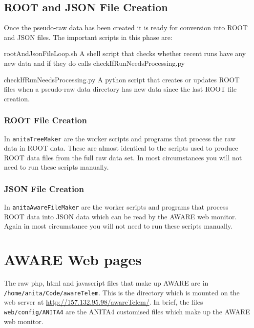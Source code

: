 \documentclass{article}
\begin{document}
\subsection{ROOT and JSON File Creation}
Once the pseudo-raw data has been created it is ready for conversion into ROOT and JSON files. The important scripts in this phase are:
\begin{description}
\item{rootAndJsonFileLoop.sh} A shell script that checks whether recent runs have any new data and if they do calls checkIfRunNeedsProcessing.py
\item{checkIfRunNeedsProcessing.py} A python script that creates or updates ROOT files when a pseudo-raw data directory has new data since the last ROOT file creation.
\end{description}

\subsubsection{ROOT File Creation}
In {\tt anitaTreeMaker} are the worker scripts and programs that process the raw data in ROOT data. These are almost identical to the scripts used to produce ROOT data files from the full raw data set. In most circumstances you will not need to run these scripts manually.

\subsubsection{JSON File Creation}
In {\tt anitaAwareFileMaker} are the worker scripts and programs that process ROOT data into JSON data which can be read by the AWARE web monitor. Again in most circumstance you will not need to run these scripts manually.

\section{AWARE Web pages}
The raw php, html and javascript files that make up AWARE are in {\tt /home/anita/Code/awareTelem}. This is the directory which is mounted on the web server at \url{http://157.132.95.98/awareTelem/}. In brief, the files {\tt web/config/ANITA4} are the ANITA4 customised files which make up the AWARE web monitor.
\end{document}
